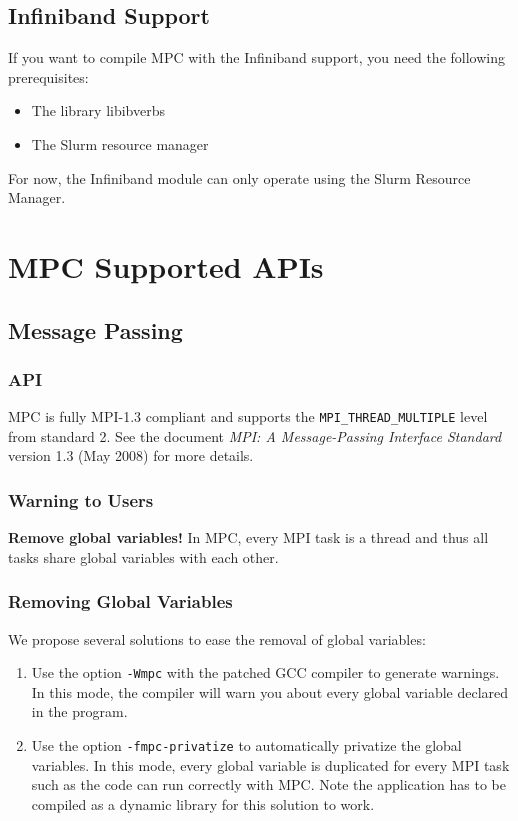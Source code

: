 \documentclass[a4paper,11pt]{article}
\begin{document}
\subsection{Infiniband Support}
\label{sec:installationInfinibandSupport}

If you want to compile MPC with the Infiniband support, you need the following prerequisites:
\begin{itemize}
	\item The library libibverbs
	\item The Slurm resource manager
\end{itemize}
For now, the Infiniband module can only operate using the Slurm Resource Manager.

\section{MPC Supported APIs}
\label{sec:APIs}

\subsection{Message Passing}

\subsubsection{API}
MPC is fully MPI-1.3 compliant and supports the \texttt{MPI\_THREAD\_MULTIPLE} level from standard 2.
See the document \emph{MPI: A Message-Passing Interface Standard} version 1.3
(May 2008) for more details.

\subsubsection{Warning to Users}
\textbf{Remove global variables!}
In MPC, every MPI task is a thread and thus all tasks share global variables
with each other.

\subsubsection{Removing Global Variables}
We propose several solutions to ease the removal of global variables:
\begin{enumerate}
\item Use the option \texttt{-Wmpc} with the patched GCC compiler to generate warnings.
In this mode, the compiler will warn you about every global variable declared in the program.
\item Use the option \texttt{-fmpc-privatize} to automatically privatize the global variables.
In this mode, every global variable is duplicated for every MPI task such as the code can run correctly with MPC.
Note the application has to be compiled as a dynamic library for this solution to work.
\end{enumerate}
\end{document}
